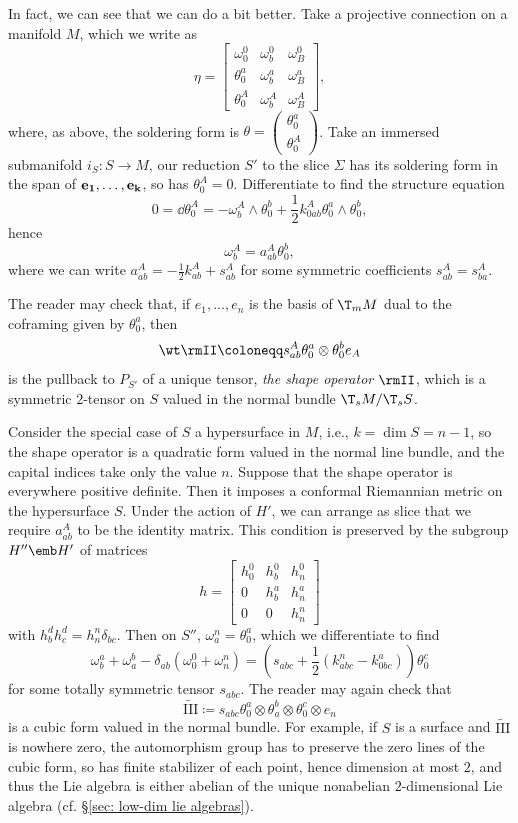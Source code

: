 In fact, we can see that we can do a bit better. Take a projective connection on a manifold $M$, which we write as 
\[\eta=\begin{bmatrix}
    \omega^0_0 & \omega^0_b & \omega^0_B\\
    \theta^a_0 & \omega^a_b & \omega^a_B\\
    \theta^A_0 & \omega^A_b & \omega^A_B
\end{bmatrix},\]
where, as above, the soldering form is $\theta=\left(\begin{smallmatrix}
    \theta^a_0\\\theta^A_0
\end{smallmatrix}\right)$. Take an immersed submanifold $i_S:S\to M$, our reduction $S'$ to the slice $\varSigma$ has its soldering form in the span of $\bf{e}_1,\ldots,\bf{e}_k$, so has $\theta^A_0=0$. Differentiate to find the structure equation
\[0=\dd\theta^A_0=-\omega^A_b\wedge\theta^b_0+\frac12 k^A_{0ab}\theta^a_0\wedge\theta^b_0,\]
hence 
\[\omega^A_b=a^A_{ab}\theta^b_0,\]
where we can write $a^A_{ab}=-\frac12 k^A_{ab}+s^A_{ab}$ for some symmetric coefficients $s^A_{ab}=s^A_{ba}$.

The reader may check that, if $e_1,\ldots,e_n$ is the basis of $\T_m M$ dual to the coframing given by $\theta^a_0$, then 
\[\wt\rmII\coloneqq s^A_{ab}\theta^a_0\otimes \theta^b_0 e_A\]
is the pullback to $P_{S'}$ of a unique tensor, \emph{the shape operator} $\rmII$, which is a symmetric $2$-tensor on $S$ valued in the normal bundle $\T_s M\slash \T_s S$.

Consider the special case of $S$ a hypersurface in $M$, i.e., $k=\dim S=n-1$, so the shape operator is a quadratic form valued in the normal line bundle, and the capital indices take only the value $n$. Suppose that the shape operator is everywhere positive definite. Then it imposes a conformal Riemannian metric on the hypersurface $S$. Under the action of $H'$, we can arrange as slice that we require $a^A_{ab}$ to be the identity matrix. This condition is preserved by the subgroup $H''\emb H'$ of matrices 
\[h=\begin{bmatrix}
    h^0_0 & h^0_b & h^0_n\\
    0 & h^a_b & h^a_n\\
    0 & 0 & h^n_n
\end{bmatrix}\]
with $h^d_bh^d_c=h^n_n\delta_{bc}$. Then on $S''$, $\omega^n_a=\theta^a_0$, which we differentiate to find 
\[\omega^a_b+\omega^b_a-\delta_{ab}(\omega^0_0+\omega^n_n)=\left(s_{abc}+\frac12(k^n_{abc}-k^a_{0bc})\right)\theta^c_0\]
for some totally symmetric tensor $s_{abc}$. The reader may again check that 
\[\widetilde{\mathrm{III}}\coloneqq s_{abc}\theta^a_0\otimes\theta^b_a\otimes\theta^c_0\otimes e_n\]
is a cubic form valued in the normal bundle. For example, if $S$ is a surface and $\widetilde{\mathrm{III}}$ is nowhere zero, the automorphism group has to preserve the zero lines of the cubic form, so has finite stabilizer of each point, hence dimension at most $2$, and thus the Lie algebra is either abelian of the unique nonabelian $2$-dimensional Lie algebra (cf. \S\ref{sec: low-dim lie algebras}).







